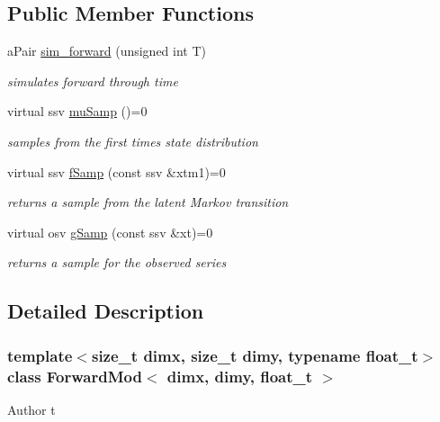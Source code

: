 \subsection*{Public Member Functions}
\begin{DoxyCompactItemize}
\item 
\mbox{\label{classForwardMod_a374c715382620bef4475b233340dcbbc}} 
a\+Pair \hyperlink{classForwardMod_a374c715382620bef4475b233340dcbbc}{sim\+\_\+forward} (unsigned int T)
\begin{DoxyCompactList}\small\item\em simulates forward through time \end{DoxyCompactList}\item 
virtual ssv \hyperlink{classForwardMod_aa768950ea619560a820905eb71eed82c}{mu\+Samp} ()=0
\begin{DoxyCompactList}\small\item\em samples from the first time\textquotesingle{}s state distribution \end{DoxyCompactList}\item 
virtual ssv \hyperlink{classForwardMod_aa46752032b11a6ac76cd01e13780a932}{f\+Samp} (const ssv \&xtm1)=0
\begin{DoxyCompactList}\small\item\em returns a sample from the latent Markov transition \end{DoxyCompactList}\item 
virtual osv \hyperlink{classForwardMod_a3264f80eae33f89a504cdb25634cadda}{g\+Samp} (const ssv \&xt)=0
\begin{DoxyCompactList}\small\item\em returns a sample for the observed series \end{DoxyCompactList}\end{DoxyCompactItemize}


\subsection{Detailed Description}
\subsubsection*{template$<$size\+\_\+t dimx, size\+\_\+t dimy, typename float\+\_\+t$>$\newline
class Forward\+Mod$<$ dimx, dimy, float\+\_\+t $>$}

\begin{DoxyAuthor}{Author}
t 
\end{DoxyAuthor}


